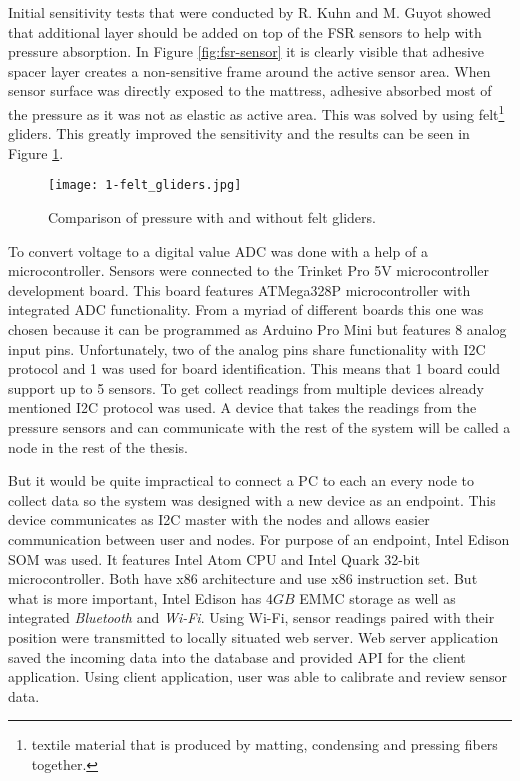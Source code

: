 Initial sensitivity tests that were conducted by R. Kuhn and M. Guyot showed that additional layer should be added on top of the \ac{FSR} sensors to help with pressure absorption. In Figure \ref{fig:fsr-sensor} it is clearly visible that adhesive spacer layer creates a non-sensitive frame around the active sensor area. When sensor surface was directly exposed to the mattress, adhesive absorbed most of the pressure as it was not as elastic as active area. This was solved by using felt\footnote{textile material that is produced by matting, condensing and pressing fibers together.} gliders. This greatly improved the sensitivity and the results can be seen in Figure \ref{fig:felt_gliders}.

\begin{figure}[h]
  \begin{center}
    \texttt{[image: 1-felt\_gliders.jpg]}
  \end{center}
  \caption{Comparison of pressure with and without felt gliders.}
  \label{fig:felt_gliders}
\end{figure}

To convert voltage to a digital value \ac{ADC} was done with a help of a microcontroller. Sensors were connected to the Trinket Pro 5V microcontroller development board\cite{Trinket}. This board features ATMega328P microcontroller with integrated \ac{ADC} functionality\cite{atmega328p}. From a myriad of different boards this one was chosen because it can be programmed as Arduino Pro Mini but features 8 analog input pins. Unfortunately, two of the analog pins share functionality with \ac{I2C} protocol and 1 was used for board identification. This means that 1 board could support up to 5 sensors. To get collect readings from multiple devices already mentioned \ac{I2C} protocol was used. A device that takes the readings from the pressure sensors and can communicate with the rest of the system will be called a node in the rest of the thesis.

But it would be quite impractical to connect a \ac{PC} to each an every node to collect data so the system was designed with a new device as an endpoint. This device communicates as \ac{I2C} master with the nodes and allows easier communication between user and nodes. For purpose of an endpoint, Intel Edison \ac{SOM} was used. It features Intel Atom \ac{CPU} and Intel Quark 32-bit microcontroller\cite{Edison}. Both have x86 architecture and use x86 instruction set. But what is more important, Intel Edison has $4GB$ \ac{EMMC} storage as well as integrated \textit{Bluetooth} and \textit{Wi-Fi}. Using Wi-Fi, sensor readings paired with their position were transmitted to locally situated web server. Web server application saved the incoming data into the database and provided \ac{API} for the client application. Using client application, user was able to calibrate and review sensor data.



